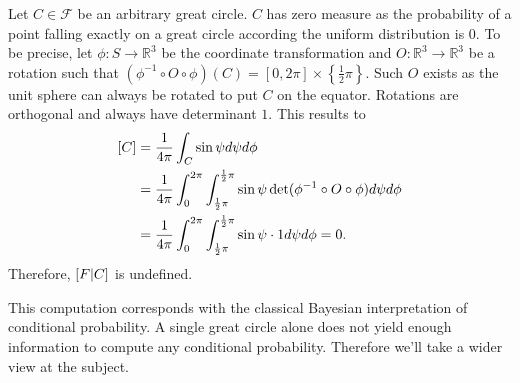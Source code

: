 \documentclass[twoside,a4paper]{article}
\theoremstyle{plain}
\theoremstyle{definition}
\theoremstyle{remark}
\numberwithin{equation}{section}
\newcommand{\R}{\mathbb{R}}
\let\P\relax
\DeclareMathOperator{\P}{\mathbb{P}}
\DeclareMathOperator{\1}{\mathbbm{1}}
\newcommand{\F}{\mathcal{F}}
\begin{document}
Let $C\in \F$ be an arbitrary great circle. $C$ has zero measure as the probability of a point falling exactly on a great circle according the uniform distribution is $0$. To be precise, let $\phi\colon S\to\R^3$ be the coordinate transformation and $O\colon\R^3\to\R^3$ be a rotation such that $(\phi^{-1}\circ O\circ \phi)(C)=[0,2\pi]\times\left\{\frac{1}{2}\pi\right\}$. Such $O$ exists as the unit sphere can always be rotated to put $C$ on the equator. Rotations are orthogonal and always have determinant $1$. This results to
\begin{align*}
\P[C]&=\frac{1}{4\pi}\int_C\sin\psi d\psi d\phi\\
&=\frac{1}{4\pi}\int_0^{2\pi}\int_{\frac{1}{2}\pi}^{\frac{1}{2}\pi}\sin\psi \det(\phi^{-1}\circ O\circ\phi)d\psi d\phi\\
&=\frac{1}{4\pi}\int_0^{2\pi}\int_{\frac{1}{2}\pi}^{\frac{1}{2}\pi}\sin\psi \cdot 1d\psi d\phi=0.
\end{align*}
Therefore, $\P[F|C]$ is undefined.

This computation corresponds with the classical Bayesian interpretation of conditional probability. A single great circle alone does not yield enough information to compute any conditional probability. Therefore we'll take a wider view at the subject.
\end{document}
